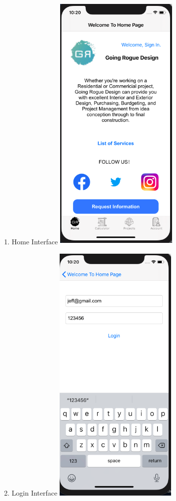 \documentclass[onecolumn, draftclsnofoot,10pt, compsoc]{IEEEtran}
\begin{document}
\begin{enumerate}
  \item Home Interface\newline\newline
  \includegraphics[width=6cm, height=13cm]{ios-home.png}\newline
  \newpage
    \item Login Interface\newline\newline
  \includegraphics[width=6cm, height=13cm]{ios-login.png}\newline

\end{enumerate}
\end{document}
